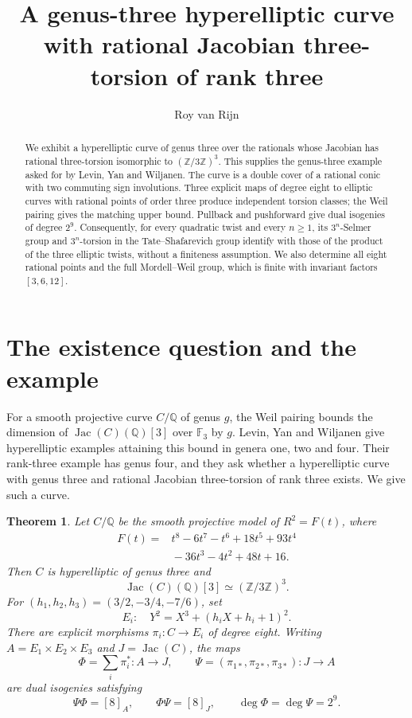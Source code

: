 \documentclass[11pt,reqno]{amsart}
\title[A genus-three curve with rational three-torsion]{A genus-three hyperelliptic curve with rational Jacobian three-torsion of rank three}
\author{Roy van Rijn}
\date{}
\newtheorem{theorem}{Theorem}
\theoremstyle{remark}
\newcommand{\Q}{\mathbb Q}
\newcommand{\Z}{\mathbb Z}
\newcommand{\F}{\mathbb F}
\newcommand{\Jac}{\operatorname{Jac}}
\begin{document}
\begin{abstract}
We exhibit a hyperelliptic curve of genus three over the rationals whose
Jacobian has rational three-torsion isomorphic to \((\Z/3\Z)^3\).
This supplies the genus-three example asked for by Levin, Yan and Wiljanen.
The curve is a double cover of a rational conic with two commuting sign
involutions. Three explicit maps of degree eight to elliptic curves with
rational points of order three produce independent torsion classes; the
Weil pairing gives the matching upper bound. Pullback and pushforward
give dual isogenies of degree \(2^9\). Consequently, for every quadratic
twist and every \(n\geq1\), its \(3^n\)-Selmer group and
\(3^n\)-torsion in the Tate--Shafarevich group identify with those of
the product of the three elliptic twists, without a finiteness assumption.
We also determine all eight rational points and the full Mordell--Weil
group, which is finite with invariant factors \([3,6,12]\).
\end{abstract}
\maketitle

\section{The existence question and the example}

For a smooth projective curve \(C/\Q\) of genus \(g\), the Weil pairing
bounds the dimension of \(\Jac(C)(\Q)[3]\) over \(\F_3\) by \(g\).
Levin, Yan and Wiljanen \cite[Theorem~9 and the following discussion]{LYW}
give hyperelliptic examples attaining this bound in genera one, two and
four. Their rank-three example has genus four, and they ask whether
a hyperelliptic curve with genus three and rational Jacobian
three-torsion of rank three exists. We give such a curve.

\begin{theorem}\label{thm:main}
Let \(C/\Q\) be the smooth projective model of \(R^2=F(t)\), where
\begin{equation}\label{eq:octic}
\begin{split}
 F(t)={}&t^8-6t^7-t^6+18t^5+93t^4\\
        &{}-36t^3-4t^2+48t+16.
\end{split}
\end{equation}
Then \(C\) is hyperelliptic of genus three and
\[
 \Jac(C)(\Q)[3]\simeq(\Z/3\Z)^3.
\]
For \((h_1,h_2,h_3)=(3/2,-3/4,-7/6)\), set
\begin{equation}\label{eq:elliptic}
 E_i:\quad Y^2=X^3+(h_iX+h_i+1)^2.
\end{equation}
There are explicit morphisms \(\pi_i:C\to E_i\) of degree eight.
Writing \(A=E_1\times E_2\times E_3\) and \(J=\Jac(C)\), the maps
\[
 \Phi=\sum_i\pi_i^*:A\longrightarrow J,
 \qquad
 \Psi=(\pi_{1*},\pi_{2*},\pi_{3*}):J\longrightarrow A
\]
are dual isogenies satisfying
\begin{equation}\label{eq:composites}
 \Psi\Phi=[8]_A,\qquad \Phi\Psi=[8]_J,
 \qquad \deg\Phi=\deg\Psi=2^9.
\end{equation}
\end{theorem}
\end{document}

